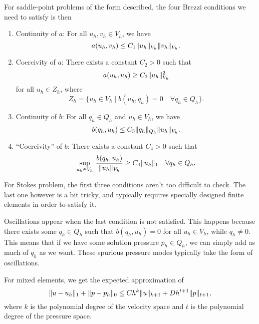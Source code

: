 For saddle-point problems of the form described, the four Brezzi conditions we need to satisfy is then
\begin{enumerate}
    \item Continuity of $a$: For all \( u_h, v_h \in V_h \), we have
        \begin{equation}
            a(u_h, v_h) \leq C_1 \lVert u_h\rVert_{V_h} \lVert v_h\rVert_{V_h}.
        \end{equation}

    \item Coercivity of $a$: There exists a constant \( C_2 > 0 \) such that
        \begin{equation}
            a(u_h, u_h) \geq C_2 \lVert u_h\rVert_{V_h}^2
        \end{equation}
        for all $u_h \in Z_h$, where
        \begin{equation*}
            Z_h = \{u_h \in V_h \mid b(u_h, q_h) = 0 \quad \forall q_h \in Q_h \}.
        \end{equation*}

    \item Continuity of $b$: For all \( q_h \in Q_h \) and \( u_h \in V_h \), we have
        \begin{equation}
            b(q_h, u_h) \leq C_3 \lVert q_h\rVert_{Q_h} \lVert u_h\rVert_{V_h}.
        \end{equation}

    \item ``Coercivity'' of $b$: There exists a constant \( C_4 > 0 \) such that
        \begin{equation}
            \sup_{u_h \in V_h}\, \frac{b(q_h, u_h)}{\lVert u_h\rVert_{V_h}} \geq C_4 \lVert u_h\rVert_1 \quad \forall q_h \in Q_h.
        \end{equation}
\end{enumerate}
For Stokes problem, the first three conditions aren't too difficult to check.
The last one however is a bit tricky, and typically requires specially designed finite elements in order to satisfy it.

Oscillations appear when the last condition is not satisfied.
This happens because there exists some $q_h \in Q_h$ such that $b(q_h, u_h) = 0$ for all $u_h \in V_h$, while $q_h \neq 0$.
This means that if we have some solution pressure $p_h \in Q_h$, we can simply add as much of $q_h$ as we want.
These spurious pressure modes typically take the form of oscillations.

For mixed elements, we get the expected approximation of
\begin{equation}
    \lVert u - u_h\rVert_{1} + \lVert p - p_h\rVert_{0} \leq C h^k \lVert u\rVert_{k+1} + D h^{t+1} \lVert p\rVert_{t+1},
\end{equation}
where $k$ is the polynomial degree of the velocity space and $t$ is the polynomial degree of the pressure space.

